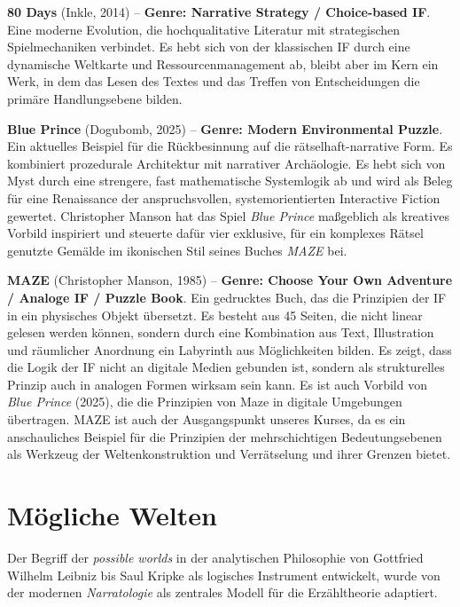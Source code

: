 \documentclass[parskip=half,a4paper,11pt]{scrreprt}
\begin{document}
\textbf{80 Days} (Inkle, 2014) – \textbf{Genre: Narrative Strategy / Choice-based IF}. Eine moderne Evolution, die hochqualitative Literatur mit strategischen Spielmechaniken verbindet. Es hebt sich von der klassischen IF durch eine dynamische Weltkarte und Ressourcenmanagement ab, bleibt aber im Kern ein Werk, in dem das Lesen des Textes und das Treffen von Entscheidungen die primäre Handlungsebene bilden.

\textbf{Blue Prince} (Dogubomb, 2025) – \textbf{Genre: Modern Environmental Puzzle}. Ein aktuelles Beispiel für die Rückbesinnung auf die rätselhaft-narrative Form. Es kombiniert prozedurale Architektur mit narrativer Archäologie. Es hebt sich von Myst durch eine strengere, fast mathematische Systemlogik ab und wird als Beleg für eine Renaissance der anspruchsvollen, systemorientierten Interactive Fiction gewertet. Christopher Manson hat das Spiel \textit{Blue Prince} maßgeblich als kreatives Vorbild inspiriert und steuerte dafür vier exklusive, für ein komplexes Rätsel genutzte Gemälde im ikonischen Stil seines Buches \textit{MAZE} bei.

\textbf{MAZE} (Christopher Manson, 1985) – \textbf{Genre: Choose Your Own Adventure / Analoge IF / Puzzle Book}. Ein gedrucktes Buch, das die Prinzipien der IF in ein physisches Objekt übersetzt. Es besteht aus 45 Seiten, die nicht linear gelesen werden können, sondern durch eine Kombination aus Text, Illustration und räumlicher Anordnung ein Labyrinth aus Möglichkeiten bilden. Es zeigt, dass die Logik der IF nicht an digitale Medien gebunden ist, sondern als strukturelles Prinzip auch in analogen Formen wirksam sein kann. Es ist auch Vorbild von \textit{Blue Prince} (2025), die die Prinzipien von Maze in digitale Umgebungen übertragen. MAZE ist auch der Ausgangspunkt unseres Kurses, da es ein anschauliches Beispiel für die Prinzipien der mehrschichtigen Bedeutungsebenen als Werkzeug der Weltenkonstruktion und Verrätselung und ihrer Grenzen bietet.

\section{Mögliche Welten}

Der Begriff der \textit{possible worlds} in der analytischen Philosophie von Gottfried Wilhelm Leibniz bis Saul Kripke als logisches Instrument entwickelt, wurde von der modernen \textit{Narratologie} als zentrales Modell für die Erzähltheorie adaptiert. 
\end{document}
